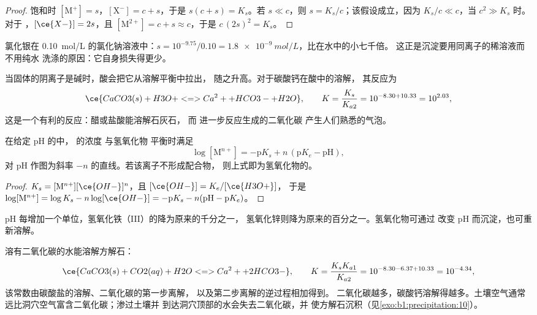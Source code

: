 \begin{proof}
饱和时 $[\mathrm{M}^+] = s$，$[\mathrm{X}^-] = c + s$，于是
$s(c + s) = K_s$。若 $s \ll c$，则 $s = K_s/c$；该假设成立，因为
$K_s/c \ll c$，当 $c^2 \gg K_s$ 时。对于 ，$[\ce{X-}] = 2s$，且
$[\mathrm{M}^{2+}] = c + s \approx c$，于是 $c\,(2s)^2 = K_s$。
\end{proof}

氯化银在 \qty{0.10}{mol/L} 的氯化钠溶液中：$s = 10^{-9.75}/0.10
= \qty{1.8e-9}{mol/L}$，比在水中的小七千倍。
这正是沉淀要用同离子的稀溶液而不用纯水
洗涤的原因：它自身损失得更少。

当固体的阴离子是碱时，酸会把它从溶解平衡中拉出，
随之升高。对于碳酸钙在酸中的溶解，
其反应为
\[
  \ce{CaCO3(s) + H3O+ <=> Ca^2+ + HCO3- + H2O}, \qquad
  K = \frac{K_s}{K_{a2}} = 10^{-8.30 + 10.33} = 10^{2.03} ,
\]
这是一个有利的反应：醋或盐酸能溶解石灰石，
而  进一步反应生成的二氧化碳
产生人们熟悉的气泡。

\begin{proposition}\label{prop:b1:precipitation:hydroxide-ph}
在给定 pH 的中， 的浓度
与氢氧化物  平衡时满足
\[
  \log[\mathrm{M}^{n+}] = -\mathrm{p}K_s + n\,(\mathrm{p}K_e - \mathrm{pH}) ,
\]
对 pH 作图为斜率 $-n$ 的直线。若该离子不形成配合物，
则上式即为氢氧化物的。
\end{proposition}

\begin{proof}
$K_s = [\mathrm{M}^{n+}][\ce{OH-}]^n$，且 $[\ce{OH-}] = K_e/[\ce{H3O+}]$，
于是 $\log[\mathrm{M}^{n+}] = \log K_s - n\log[\ce{OH-}] = -\mathrm{p}K_s -
n(\mathrm{pH} - \mathrm{p}K_e)$。
\end{proof}

pH 每增加一个单位，氢氧化铁（III）的降为原来的千分之一，
氢氧化锌则降为原来的百分之一。氢氧化物可通过
改变 pH 而沉淀，也可重新溶解。

\begin{example}[用二氧化碳溶解碳酸钙]\label{ex:b1:precipitation:cave}
溶有二氧化碳的水能溶解方解石：
\[
  \ce{CaCO3(s) + CO2(aq) + H2O <=> Ca^2+ + 2HCO3-}, \qquad
  K = \frac{K_s K_{a1}}{K_{a2}} = 10^{-8.30 - 6.37 + 10.33} = 10^{-4.34} ,
\]
该常数由碳酸盐的溶解、二氧化碳的第一步离解，
以及第二步离解的逆过程相加得到。
二氧化碳越多，碳酸钙溶解得越多。土壤空气通常
远比洞穴空气富含二氧化碳；渗过土壤并
到达洞穴顶部的水会失去二氧化碳，并
使方解石沉积（见\cref{exo:b1:precipitation:10}）。
\end{example}

